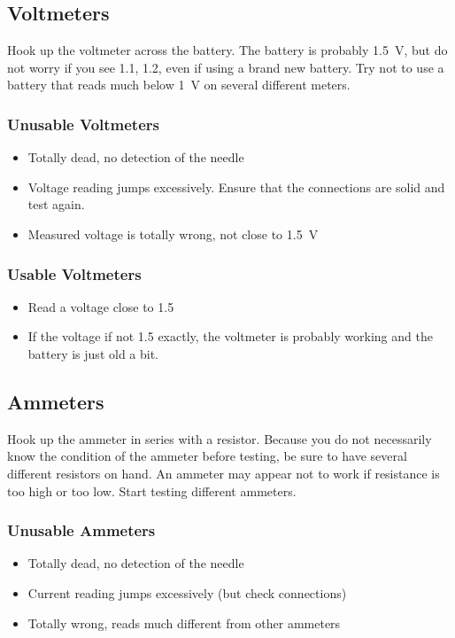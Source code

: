 \subsection{Voltmeters}
Hook up the voltmeter across the battery. The battery is probably 1.5~V, but
do not worry if you see 1.1, 1.2, even if using a brand new battery. Try not to
use a battery that reads much below 1~V on several different meters.  
\subsubsection{Unusable Voltmeters}
\begin{itemize}
\item{Totally dead, no detection of the needle}
\item{Voltage reading jumps excessively. Ensure that the connections are solid
and test again.}
\item{Measured voltage is totally wrong, not close to 1.5~V}
\end{itemize}
\subsubsection{Usable Voltmeters}
\begin{itemize}
\item{Read a voltage close to 1.5}
\item{If the voltage if not 1.5 exactly, the voltmeter is probably working and the battery is just old a bit.}  
\end{itemize}
\subsection{Ammeters}
Hook up the ammeter in series with a resistor. Because you do not necessarily
know the condition of the ammeter before testing, be sure to have several different
resistors on hand. An ammeter may appear not to work if resistance is
too high or too low. Start testing different ammeters.  
\subsubsection{Unusable Ammeters}
\begin{itemize}
\item{Totally dead, no detection of the needle}
\item{Current reading jumps excessively (but check connections)}
\item{Totally wrong, reads much different from other ammeters}
\end{itemize}

